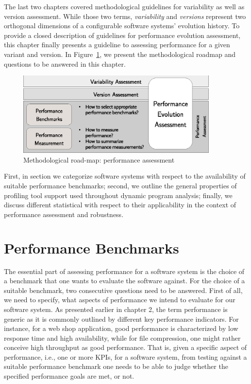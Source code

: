 The last two chapters covered methodological guidelines for variability as well
as version assessment. While those two terms, \emph{variability} and
\emph{versions} represent two orthogonal dimensions of a configurable software
systems’ evolution history. To provide a closed description of guidelines for performance
evolution assessment, this chapter finally presents a guideline to assessing
performance for a given variant and version. In Figure~\ref{fig:roadmap_3}, we
present the methodological roadmap and questions to be answered in this chapter.

\begin{figure}[h!]
	\centering
	\includegraphics[width=0.9\textwidth]{images/process_perfassessment.eps}
	\caption{Methodological road-map: performance assessment}
	\label{fig:roadmap_3}
\end{figure}

First, in section we categorize software systems with respect to the availability of suitable performance
benchmarks; second, we outline the general properties of profiling tool support
used throughout dynamic program analysis; finally, we discuss different statistical
with respect to their applicability in the context of performance assessment
and robustness.

\section{Performance Benchmarks}
The essential part of assessing performance for a software system is the choice
of a benchmark that one wants to evaluate the software against. For the choice
of a suitable benchmark, two consecutive questions need to be answered. First of
all, we need to specify, what aspects of performance we intend to evaluate for
our software system. As presented earlier in chapter 2, the term performance is
generic as it is commonly outlined by different key performance indicators. For
instance, for a web shop application, good performance is characterized by low response
time and high availability, while for file compression, one might rather
conceive high throughput as good performance. That is, given a specific
aspect of performance, i.e., one or more KPIs, for a software system, from
testing against a suitable performance benchmark one needs to be able to judge
whether the specified performance goals are met, or not.

